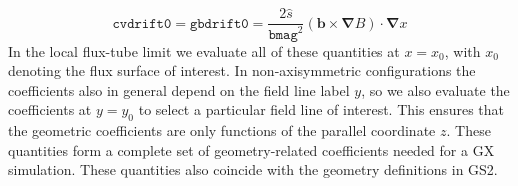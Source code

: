 \documentclass{jpp}
\newcommand{\GX}{{GX}\xspace}
\begin{document}
\begin{equation}
    \texttt{cvdrift0} = \texttt{gbdrift0} =  \frac{2\hat{s}}{\texttt{bmag}^2}(\boldsymbol{b} \times \boldsymbol{\nabla}B)\cdot \boldsymbol{\nabla}x
\end{equation}
{\color{black} In the local flux-tube limit 
 we evaluate all of these quantities at $x=x_0$, with $x_0$ denoting the flux surface of interest. In non-axisymmetric configurations the coefficients also in general depend on the field line label $y$, so we also evaluate the coefficients at $y=y_0$ to select a particular field line of interest. This ensures that the geometric coefficients are only functions of the parallel coordinate $z$.} These quantities form a complete set of geometry-related coefficients needed for a \GX simulation. These quantities also coincide with the geometry definitions in GS2.
\end{document}
